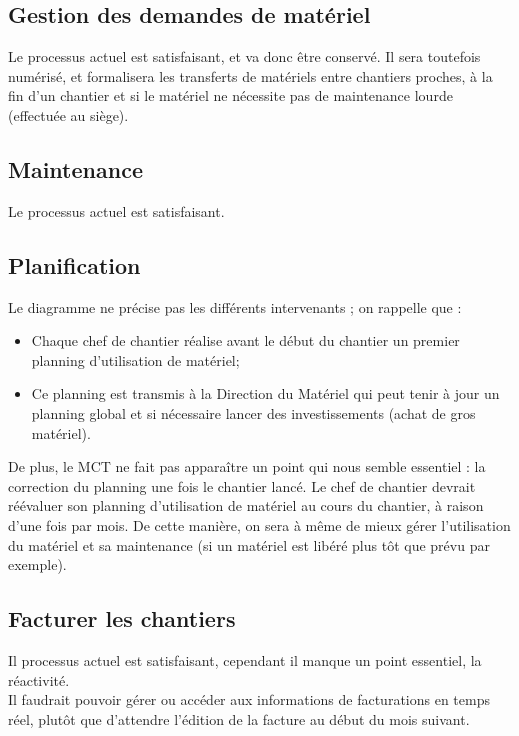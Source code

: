 \subsection{Gestion des demandes de matériel}


Le processus actuel est satisfaisant, et va donc être conservé. Il sera
toutefois numérisé, et formalisera les transferts de matériels entre
chantiers proches, à la fin d'un chantier et si le matériel ne nécessite
pas de maintenance lourde (effectuée au siège).


\subsection{Maintenance}

Le processus actuel est satisfaisant.

\subsection{Planification}

Le diagramme ne précise pas les différents intervenants ; on rappelle que :
\begin{itemize}
\item Chaque chef de chantier réalise avant le début du chantier un premier
planning d'utilisation de matériel;
\item Ce planning est transmis à la Direction du Matériel qui peut tenir à
jour un planning global et si nécessaire lancer des investissements (achat
de gros matériel).
\end{itemize}

\vskip 6pt

De plus, le MCT ne fait pas apparaître un point qui nous semble essentiel :
la correction du planning une fois le chantier lancé. Le chef de chantier
devrait réévaluer son planning d'utilisation de matériel au cours du
chantier, à raison d'une fois par mois. De cette manière, on sera à même de
mieux gérer l'utilisation du matériel et sa maintenance (si un matériel est
libéré plus tôt que prévu par exemple).


\subsection{Facturer les chantiers}

Il processus actuel est satisfaisant, cependant il manque un point essentiel,
la réactivité. \\
Il faudrait pouvoir gérer ou accéder aux informations de facturations en 
temps réel, plutôt que d’attendre l'édition de la facture au début du 
mois suivant.


